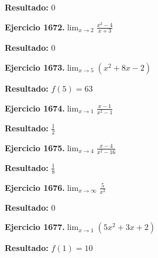 \documentclass[10pt,a4paper]{article}
\begin{document}
\begin{solbox}
\textbf{Resultado:} \(\displaystyle 0\)
\end{solbox}

\newpage
\begin{ejbox}
\textbf{Ejercicio 1672.}\quad $\lim_{x\to 2} \frac{x^2-4}{x+3}$
\end{ejbox}

\begin{solbox}
\textbf{Resultado:} \(\displaystyle 0\)
\end{solbox}

\begin{ejbox}
\textbf{Ejercicio 1673.}\quad $\lim_{x\to 5} (x^2 +8x -2)$
\end{ejbox}

\begin{solbox}
\textbf{Resultado:} \(\displaystyle f(5) = 63\)
\end{solbox}

\begin{ejbox}
\textbf{Ejercicio 1674.}\quad $\lim_{x\to 1} \frac{x-1}{x^2-1}$
\end{ejbox}

\begin{solbox}
\textbf{Resultado:} \(\displaystyle \frac{1}{2}\)
\end{solbox}

\newpage
\begin{ejbox}
\textbf{Ejercicio 1675.}\quad $\lim_{x\to 4} \frac{x-4}{x^2-16}$
\end{ejbox}

\begin{solbox}
\textbf{Resultado:} \(\displaystyle \frac{1}{8}\)
\end{solbox}

\begin{ejbox}
\textbf{Ejercicio 1676.}\quad $\lim_{x\to \infty} \frac{5}{x^2}$
\end{ejbox}

\begin{solbox}
\textbf{Resultado:} \(\displaystyle 0\)
\end{solbox}

\begin{ejbox}
\textbf{Ejercicio 1677.}\quad $\lim_{x\to 1} (5x^2 +3x +2)$
\end{ejbox}

\begin{solbox}
\textbf{Resultado:} \(\displaystyle f(1) = 10\)
\end{solbox}
\end{document}
